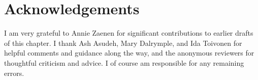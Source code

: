 \documentclass[output=paper,hidelinks]{langscibook}
\begin{document}
\section*{Acknowledgements}
I am very grateful to Annie Zaenen for significant contributions to earlier drafts of this chapter.  I thank Ash Asudeh, Mary Dalrymple, and Ida Toivonen  for helpful comments and guidance along the way, and the anonymous reviewers for thoughtful criticism and advice.  I of course am responsible for any remaining errors.

\sloppy
\printbibliography[heading=subbibliography,notkeyword=this]
\end{document}
